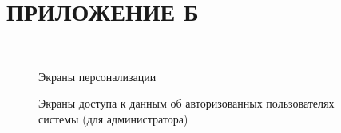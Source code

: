 \section{ПРИЛОЖЕНИЕ Б} \label{ПРИЛОЖЕНИЕ Б}
\\
\newline
\newline
\newline
\begin{figure}[ht!]
	\caption{Экраны персонализации}
	\label{fig:gui1}
\end{figure}

\begin{figure}[ht!]
	\caption{Экраны доступа к данным об авторизованных пользователях системы (для администратора)}
	\label{fig:gui2}
\end{figure}

